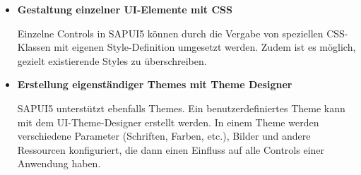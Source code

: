 \begin{itemize}[noitemsep]
\item \textbf{Gestaltung einzelner UI-Elemente mit CSS } 

Einzelne Controls in SAPUI5 können durch die Vergabe von speziellen CSS-Klassen mit eigenen Style-Definition umgesetzt werden\cite[S.261]{sapui5}. Zudem ist es möglich, gezielt existierende Styles zu überschreiben.
\item \textbf{Erstellung eigenständiger Themes mit Theme Designer} 

SAPUI5 unterstützt ebenfalls Themes. Ein benutzerdefiniertes Theme kann mit dem UI-Theme-Designer erstellt werden. In einem Theme werden verschiedene Parameter (Schriften, Farben, etc.), Bilder und andere Ressourcen konfiguriert, die dann einen Einfluss auf alle Controls einer Anwendung haben\cite{saph:bas}. 
\end{itemize}






